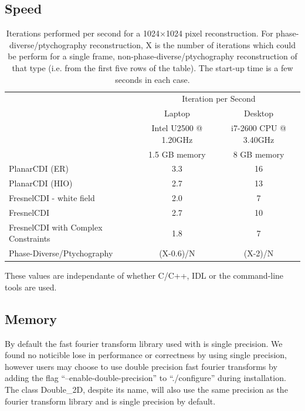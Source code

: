 \documentclass[]{cxs-software}
\begin{document}
\subsection{Speed}

\begin{table}[h!]
\begin{tabular}[h!]{lcc}
\toprule
   & \multicolumn{2}{c}{Iteration per Second} \\
   & Laptop & Desktop \\
   & Intel U2500 @ 1.20GHz & i7-2600 CPU @ 3.40GHz \\
   & 1.5 GB memory & 8 GB memory\\

\midrule
PlanarCDI (ER) & 3.3  &  16 \\
PlanarCDI (HIO) & 2.7 & 13 \\
FresnelCDI - white field & 2.0 & 7 \\
FresnelCDI & 2.7 & 10 \\
FresnelCDI with Complex Constraints & 1.8 & 7 \\
Phase-Diverse/Ptychography & (X-0.6)/N  & (X-2)/N  \\
\bottomrule
\end{tabular}

\caption{\label{table:speed} Iterations performed per second for a
  1024$\times$1024 pixel reconstruction. For
  phase-diverse/ptychography reconstruction, X is the number of
  iterations which could be perform for a single frame,
  non-phase-diverse/ptychography reconstruction of that type
  (i.e. from the first five rows of the table). The start-up time is a
  few seconds in each case. }
\end{table}



These values are independante of whether C/C++, IDL or the
command-line tools are used.

\subsection{Memory}

By default the fast fourier transform library used with \name is
single precision. We found no noticible lose in performance or
correctness by using single precision, however users may choose to use
double precision fast fourier transforms by adding the flag
``--enable-double-precision'' to ``./configure'' during installation.
The class Double\_2D, despite its name, will also use the same
precision as the fourier transform library and is single precision by
default.
\end{document}
